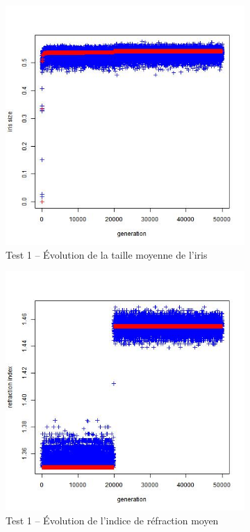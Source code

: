 \documentclass[a4paper,11pt]{article}
\begin{document}
\begin{figure}
\centering
\begin{subfigure}{.5\textwidth}
  \centering
\includegraphics[width=1\linewidth]{1487422477451_evolution_average_iris_size.jpeg}
\caption{Test 1 – Évolution de la taille moyenne de l'iris}
\label{fig:sub13}
\end{subfigure}%
\begin{subfigure}{.5\textwidth}
  \centering
\includegraphics[width=1\linewidth]{1487422477451_evolution_average_refraction_index.jpeg}
\caption{Test 1 – Évolution de l'indice de réfraction moyen}
\label{fig:sub14}
\end{subfigure}
\caption{}
\label{fig:test}
\end{figure}
\end{document}

